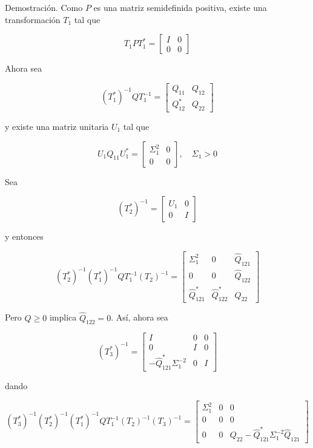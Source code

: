 Demostración. Como $P$ es una matriz semidefinida positiva, existe una transformación $T_{1}$ tal que

$$
T_{1} P T_{1}^{*}=\left[\begin{array}{ll}
I & 0 \\
0 & 0
\end{array}\right]
$$

Ahora sea

$$
\left(T_{1}^{*}\right)^{-1} Q T_{1}^{-1}=\left[\begin{array}{ll}
Q_{11} & Q_{12} \\
Q_{12}^{*} & Q_{22}
\end{array}\right]
$$

y existe una matriz unitaria $U_{1}$ tal que

$$
U_{1} Q_{11} U_{1}^{*}=\left[\begin{array}{cc}
\Sigma_{1}^{2} & 0 \\
0 & 0
\end{array}\right], \quad \Sigma_{1}>0
$$

Sea

$$
\left(T_{2}^{*}\right)^{-1}=\left[\begin{array}{cc}
U_{1} & 0 \\
0 & I
\end{array}\right]
$$

y entonces

$$
\left(T_{2}^{*}\right)^{-1}\left(T_{1}^{*}\right)^{-1} Q T_{1}^{-1}\left(T_{2}\right)^{-1}=\left[\begin{array}{ccc}
\Sigma_{1}^{2} & 0 & \hat{Q}_{121} \\
0 & 0 & \hat{Q}_{122} \\
\hat{Q}_{121}^{*} & \hat{Q}_{122}^{*} & Q_{22}
\end{array}\right]
$$

Pero $Q \geq 0$ implica $\hat{Q}_{122}=0$. Así, ahora sea

$$
\left(T_{3}^{*}\right)^{-1}=\left[\begin{array}{ccc}
I & 0 & 0 \\
0 & I & 0 \\
-\hat{Q}_{121}^{*} \Sigma_{1}^{-2} & 0 & I
\end{array}\right]
$$

dando

$$
\left(T_{3}^{*}\right)^{-1}\left(T_{2}^{*}\right)^{-1}\left(T_{1}^{*}\right)^{-1} Q T_{1}^{-1}\left(T_{2}\right)^{-1}\left(T_{3}\right)^{-1}=\left[\begin{array}{ccc}
\Sigma_{1}^{2} & 0 & 0 \\
0 & 0 & 0 \\
0 & 0 & Q_{22}-\hat{Q}_{121}^{*} \Sigma_{1}^{-2} \hat{Q}_{121}
\end{array}\right]
$$

